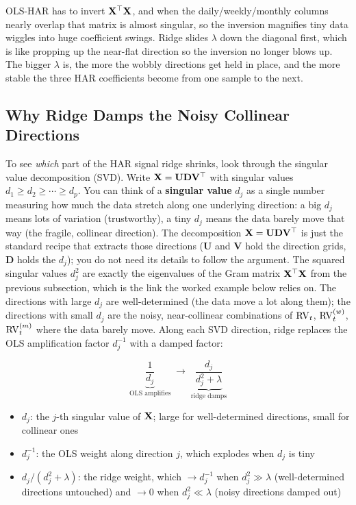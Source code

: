 \begin{intuition}
OLS-HAR has to invert $\mathbf{X}^\top\mathbf{X}$, and when the daily/weekly/monthly columns nearly overlap that matrix is almost singular, so the inversion magnifies tiny data wiggles into huge coefficient swings.
Ridge slides $\lambda$ down the diagonal first, which is like propping up the near-flat direction so the inversion no longer blows up.
The bigger $\lambda$ is, the more the wobbly directions get held in place, and the more stable the three HAR coefficients become from one sample to the next.
\end{intuition}

\subsection{Why Ridge Damps the Noisy Collinear Directions}

To see \emph{which} part of the HAR signal ridge shrinks, look through the singular value decomposition (SVD).
Write $\mathbf{X} = \mathbf{U}\mathbf{D}\mathbf{V}^\top$ with singular values $d_1 \geq d_2 \geq \cdots \geq d_p$.
You can think of a \textbf{singular value} $d_j$ as a single number measuring how much the data stretch along one underlying direction: a big $d_j$ means lots of variation (trustworthy), a tiny $d_j$ means the data barely move that way (the fragile, collinear direction).
The decomposition $\mathbf{X} = \mathbf{U}\mathbf{D}\mathbf{V}^\top$ is just the standard recipe that extracts those directions ($\mathbf{U}$ and $\mathbf{V}$ hold the direction grids, $\mathbf{D}$ holds the $d_j$); you do not need its details to follow the argument.
The squared singular values $d_j^2$ are exactly the eigenvalues of the Gram matrix $\mathbf{X}^\top\mathbf{X}$ from the previous subsection, which is the link the worked example below relies on.
The directions with large $d_j$ are well-determined (the data move a lot along them); the directions with small $d_j$ are the noisy, near-collinear combinations of $\operatorname{RV}_t$, $\operatorname{RV}^{(w)}_t$, $\operatorname{RV}^{(m)}_t$ where the data barely move.
Along each SVD direction, ridge replaces the OLS amplification factor $d_j^{-1}$ with a damped factor:

\begin{equation}
  \underbrace{\frac{1}{d_j}}_{\text{OLS amplifies}}
  \;\longrightarrow\;
  \underbrace{\frac{d_j}{d_j^2 + \lambda}}_{\text{ridge damps}}
  \label{eq:ridge-svd-shrinkage}
\end{equation}
\begin{itemize}[nosep]
  \item $d_j$: the $j$-th singular value of $\mathbf{X}$; large for well-determined directions, small for collinear ones
  \item $d_j^{-1}$: the OLS weight along direction $j$, which explodes when $d_j$ is tiny
  \item $d_j/(d_j^2+\lambda)$: the ridge weight, which $\to d_j^{-1}$ when $d_j^2 \gg \lambda$ (well-determined directions untouched) and $\to 0$ when $d_j^2 \ll \lambda$ (noisy directions damped out)
\end{itemize}

